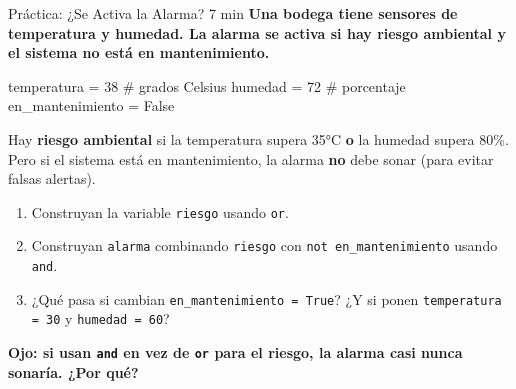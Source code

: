 \documentclass[aspectratio=169, 11pt]{beamer}
\begin{document}
\begin{frame}[fragile,shrink=30]{Práctica: ¿Se Activa la Alarma? \hfill {\normalsize\color{arcaRed}\faClock\hspace{4pt}7 min}}
  \vspace{-6pt}
  {\small\color{arcaDark}\bfseries
    Una bodega tiene sensores de temperatura y humedad.
    La alarma se activa si hay riesgo ambiental
    \textbf{y} el sistema no está en mantenimiento.}

  \vspace{5pt}
  \begin{pyblock}
temperatura = 38      # grados Celsius
humedad     = 72      # porcentaje
en_mantenimiento = False
  \end{pyblock}

  \vspace{4pt}
  {\footnotesize\color{textMuted}
    Hay \textbf{riesgo ambiental} si la temperatura
    supera 35°C \textbf{o} la humedad supera 80\%.
    Pero si el sistema está en mantenimiento, la alarma
    \textbf{no} debe sonar (para evitar falsas alertas).
  }

  \vspace{5pt}
  {\footnotesize
  \begin{enumerate}\setlength{\itemsep}{3pt}
    \item[{\color{arcaRed}\bfseries 1.}]
      Construyan la variable \texttt{riesgo} usando \texttt{or}.
    \item[{\color{arcaRed}\bfseries 2.}]
      Construyan \texttt{alarma} combinando \texttt{riesgo}
      con \texttt{not en\_mantenimiento} usando \texttt{and}.
    \item[{\color{arcaRed}\bfseries 3.}]
      ¿Qué pasa si cambian \texttt{en\_mantenimiento = True}?
      ¿Y si ponen \texttt{temperatura = 30} y \texttt{humedad = 60}?
  \end{enumerate}
  }

  \vspace{3pt}
  {\scriptsize\color{arcaRed}\bfseries
    \faExclamationTriangle\hspace{4pt}Ojo:
    si usan \texttt{and} en vez de \texttt{or} para el riesgo,
    la alarma casi nunca sonaría. ¿Por qué?}
\end{frame}
\end{document}
